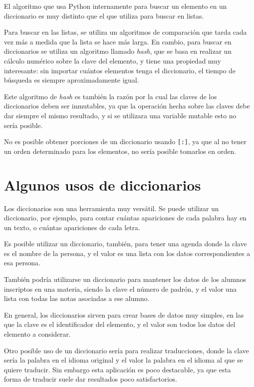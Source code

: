 \begin{sabias_que}
El algoritmo que usa Python internamente para buscar un elemento en un
diccionario es muy distinto que el que utiliza para buscar en listas.

Para buscar en las listas, se utiliza un algoritmos de comparación que
tarda cada vez más a medida que la lista se hace más larga.  En cambio,
para buscar en diccionarios se utiliza un algoritmo llamado {\it hash},
que se basa en realizar un cálculo numérico sobre la clave del elemento,
y tiene una propiedad muy interesante: sin importar cuántos elementos
tenga el diccionario, el tiempo de búsqueda es siempre aproximadamente
igual.

Este algoritmo de {\it hash} es también la razón por la cual las claves de
los diccionarios deben ser inmutables, ya que la operación hecha sobre las
claves debe dar siempre el mismo resultado, y si se utilizara una variable
mutable esto no sería posible.
\end{sabias_que}

No es posible obtener porciones de un diccionario usando \lstinline![:]!,
ya que al no tener un orden determinado para los elementos, no sería
posible tomarlos en orden.

\section{Algunos usos de diccionarios}

Los diccionarios son una herramienta muy versátil.  Se puede utilizar un
diccionario, por ejemplo, para contar cuántas apariciones de cada palabra
hay en un texto, o cuántas apariciones de cada letra.

Es posible utilizar un diccionario, también, para tener una agenda donde la
clave es el nombre de la persona, y el valor es una lista con los datos
correspondientes a esa persona.

También podría utilizarse un diccionario para mantener los datos de los
alumnos inscriptos en una materia, siendo la clave el número de padrón, y
el valor una lista con todas las notas asociadas a ese alumno.

En general, los diccionarios sirven para crear bases de datos muy simples,
en las que la clave es el identificador del elemento, y el valor son todos
los datos del elemento a considerar.

Otro posible uso de un diccionario sería para realizar
traducciones, donde la clave sería la palabra en el idioma original y el
valor la palabra en el idioma al que se quiere traducir.  Sin embargo esta
aplicación es poco destacable, ya que esta forma de traducir suele dar
resultados poco satisfactorios.

